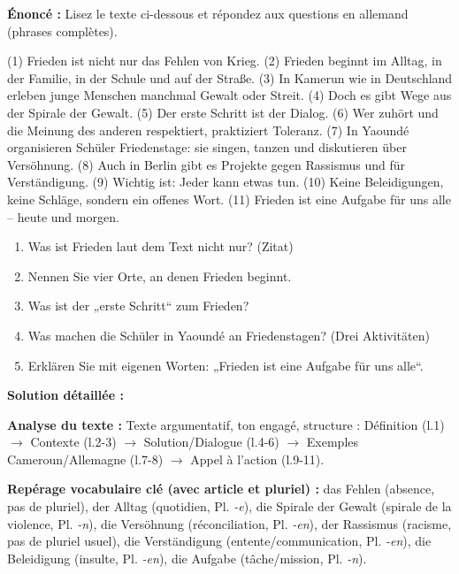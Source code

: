 \documentclass[11pt]{article}
\newcommand{\cle}[1]{{\popxbold\color{popdark}#1}}
\begin{document}
\begin{exoresolu}
\textbf{Énoncé :} Lisez le texte ci-dessous et répondez aux questions en allemand (phrases complètes).

\begin{textebox}
(1) Frieden ist nicht nur das Fehlen von Krieg. (2) Frieden beginnt im Alltag, in der Familie, in der Schule und auf der Straße. (3) In Kamerun wie in Deutschland erleben junge Menschen manchmal Gewalt oder Streit. (4) Doch es gibt Wege aus der Spirale der Gewalt. (5) Der erste Schritt ist der Dialog. (6) Wer zuhört und die Meinung des anderen respektiert, praktiziert Toleranz. (7) In Yaoundé organisieren Schüler Friedenstage: sie singen, tanzen und diskutieren über Versöhnung. (8) Auch in Berlin gibt es Projekte gegen Rassismus und für Verständigung. (9) Wichtig ist: Jeder kann etwas tun. (10) Keine Beleidigungen, keine Schläge, sondern ein offenes Wort. (11) Frieden ist eine Aufgabe für uns alle – heute und morgen.
\end{textebox}

\begin{enumerate}
\item Was ist Frieden laut dem Text nicht nur? (Zitat)
\item Nennen Sie vier Orte, an denen Frieden beginnt.
\item Was ist der „erste Schritt“ zum Frieden?
\item Was machen die Schüler in Yaoundé an Friedenstagen? (Drei Aktivitäten)
\item Erklären Sie mit eigenen Worten: „Frieden ist eine Aufgabe für uns alle“.
\end{enumerate}

\tcblower
\textbf{Solution détaillée :}

\textbf{Analyse du texte :} Texte argumentatif, ton engagé, structure : Définition (l.1) $\rightarrow$ Contexte (l.2-3) $\rightarrow$ Solution/Dialogue (l.4-6) $\rightarrow$ Exemples Cameroun/Allemagne (l.7-8) $\rightarrow$ Appel à l'action (l.9-11).

\textbf{Repérage vocabulaire clé (avec article et pluriel) :}
\cle{das Fehlen} (absence, pas de pluriel), \cle{der Alltag} (quotidien, Pl. \textit{-e}), \cle{die Spirale der Gewalt} (spirale de la violence, Pl. \textit{-n}), \cle{die Versöhnung} (réconciliation, Pl. \textit{-en}), \cle{der Rassismus} (racisme, pas de pluriel usuel), \cle{die Verständigung} (entente/communication, Pl. \textit{-en}), \cle{die Beleidigung} (insulte, Pl. \textit{-en}), \cle{die Aufgabe} (tâche/mission, Pl. \textit{-n}).


\end{exoresolu}
\end{document}
